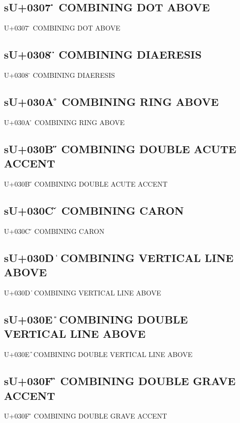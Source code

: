 \subsection{sU+0307 ̇ COMBINING DOT ABOVE}

U+0307 ̇ COMBINING DOT ABOVE

\subsection{sU+0308 ̈ COMBINING DIAERESIS}

U+0308 ̈ COMBINING DIAERESIS

\subsection{sU+030A ̊ COMBINING RING ABOVE}

U+030A ̊ COMBINING RING ABOVE

\subsection{sU+030B ̋ COMBINING DOUBLE ACUTE ACCENT}

U+030B ̋ COMBINING DOUBLE ACUTE ACCENT

\subsection{sU+030C ̌ COMBINING CARON}

U+030C ̌ COMBINING CARON

\subsection{sU+030D ̍ COMBINING VERTICAL LINE ABOVE}

U+030D ̍ COMBINING VERTICAL LINE ABOVE

\subsection{sU+030E ̎ COMBINING DOUBLE VERTICAL LINE ABOVE}

U+030E ̎ COMBINING DOUBLE VERTICAL LINE ABOVE

\subsection{sU+030F ̏ COMBINING DOUBLE GRAVE ACCENT}

U+030F ̏ COMBINING DOUBLE GRAVE ACCENT

